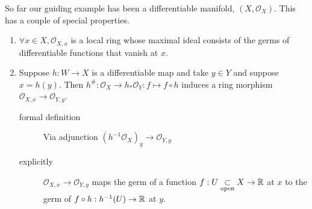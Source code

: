 So far our guiding example has been a differentiable manifold, $(X, \mathcal{O} _X)$.
This has a couple of special properties.
\begin{enumerate}
	\item $\forall x \in X, \mathcal{O}_{X,x} $ is a local ring whose maximal ideal consists of the germs of differentiable functions that vanish at $x$.
	\item Suppose $h: W \to X$ is a differentiable map and take $y \in Y$ and suppose $x = h(y)$.  
	Then $h^{\#}: \mathcal{O} _X \to h_* \mathcal{O}_Y : f\mapsto f \circ h$ induces a ring morphism $\mathcal{O} _{X,x} \to \mathcal{O} _{Y,y}$. 
	\begin{description}
		\item[formal definition] Via adjunction $(h^{-1}\mathcal{O}_X)_y \to \mathcal{O} _{Y, y}$
		\item[explicitly]
			$\mathcal{O} _{X,x}\to \mathcal{O} _{Y,y}$ maps the germ of a function $f: U \underset{\text{open}}{\subset} X \to \mathbb{R}$ at $x$ to the germ of $f\circ h: h^{-1}(U) \to \mathbb{R}$ at $y$. 
	\end{description}
\end{enumerate}

